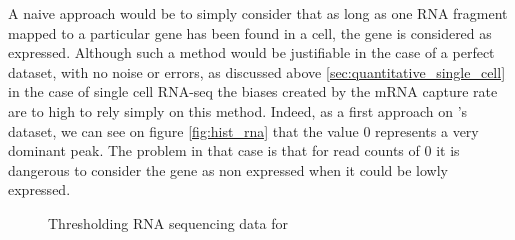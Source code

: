   A naive approach would be to simply consider that as long as one RNA fragment mapped to a particular gene has been found in a cell, the gene is considered as expressed. Although such a method would be justifiable in the case of a perfect dataset, with no noise or errors, as discussed above \ref{sec:quantitative_single_cell} in the case of single cell RNA-seq the biases created by the mRNA capture rate are to high to rely simply on this method. Indeed, as a first approach on \platy{}'s dataset, we can see on figure \ref{fig:hist_rna} that the value $0$ represents a very dominant peak. The problem in that case is that for read counts of $0$ it is dangerous to consider the gene as non expressed when it could be lowly expressed.\\
  
\begin{figure}[h]
        \myfloatalign
         \quad
        \caption{Thresholding RNA sequencing data for \platy{}}\label{fig:platynereis_single_cell}
\end{figure}
  
